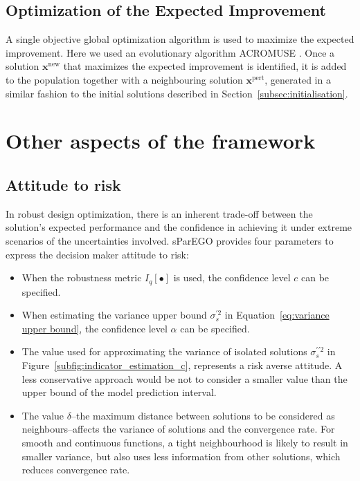 \documentclass[10pt]{llncs}
\newcommand{\Iq}[1]{I_q\!\left[{#1}\right]} %
\newcommand{\vx}{\mathbf{x}} %
\begin{document}
\subsection{Optimization of the Expected Improvement}
A single objective global optimization algorithm is used to maximize the expected improvement.
Here we used an evolutionary algorithm ACROMUSE \cite{Ginley2011}.
Once a solution $\vx^\text{new}$ that maximizes the expected improvement is identified, it is added to the population together with a neighbouring solution $\vx^\text{pert}$, generated in a similar fashion to the initial solutions described in Section~\ref{subsec:initialisation}.

\section{Other aspects of the framework}
\label{sec:Other aspects}
\subsection{Attitude to risk}
\label{subsec:risk}
In robust design optimization, there is an inherent trade-off between the solution's expected performance and the confidence in achieving it under extreme scenarios of the uncertainties involved. sParEGO provides four parameters to express the decision maker attitude to risk:
\begin{itemize}
	\item When the robustness metric $\Iq{\bullet}$ is used, the confidence level $c$ can be specified.
	\item When estimating the variance upper bound $\sigma^{\prime 2}_s$  in Equation~\eqref{eq:variance upper bound}, the confidence level $\alpha$ can be specified.
	\item The value used for approximating the variance of isolated solutions $\sigma^{\prime\prime 2}_s$ in Figure~\ref{subfig:indicator_estimation_c}, represents a risk averse attitude. A less conservative approach would be not to consider a smaller value than the upper bound of the model prediction interval.
	\item The value $\delta$--the maximum distance between solutions to be considered as neighbours--affects the variance of solutions and the convergence rate.
		For smooth and continuous functions, a tight neighbourhood is likely to result in smaller variance, but also uses less information from other solutions, which reduces convergence rate.
\end{itemize}
\end{document}
